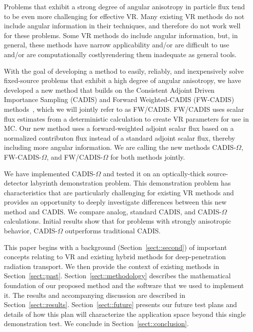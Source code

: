 \documentclass[12pt]{article}
\begin{document}
Problems that exhibit a strong degree of angular anisotropy in particle flux tend to be even more challenging for effective VR.
Many existing VR methods do not include angular information in their techniques, and therefore do not work well for these problems.  
Some VR methods do include angular information, but, in general, these methods have narrow applicability and/or are difficult to use and/or are computationally costly\textemdash rendering them inadequate as general tools.

With the goal of developing a method to easily, reliably, and inexpensively solve fixed-source problems that exhibit a high degree of angular anisotropy, we have developed a new method that builds on the Consistent Adjoint Driven Importance Sampling (CADIS) and Forward Weighted-CADIS (FW-CADIS) methods~\cite{wagner_forward-weighted_2007}, which we will jointly refer to as FW/CADIS. 
FW/CADIS uses scalar flux estimates from a deterministic calculation to create VR parameters for use in MC.
Our new method uses a forward-weighted adjoint scalar flux based on a normalized contributon flux instead of a standard adjoint scalar flux, thereby including more angular information. 
We are calling the new methods CADIS-$\Omega$, FW-CADIS-$\Omega$, and FW/CADIS-$\Omega$ for both methods jointly.

We have implemented CADIS-$\Omega$ and tested it on an optically-thick source-detector labyrinth demonstration problem.
This demonstration problem has characteristics that are particularly challenging for existing VR methods and provides an opportunity to deeply investigate differences between this new method and CADIS.
We compare analog, standard CADIS, and CADIS-$\Omega$ calculations. 
Initial results show that for problems with strongly anisotropic behavior, CADIS-$\Omega$ outperforms traditional CADIS.

This paper begins with a background (Section~\ref{sect::second}) of important concepts relating to VR and existing hybrid methods for deep-penetration radiation transport. 
We then provide the context of existing methods in Section~\ref{sect::past}. 
Section~\ref{sect::methodology} describes the mathematical foundation of our proposed method and the software that we used to implement it. 
The results and accompanying discussion are described in Section~\ref{sect::results}. Section~\ref{sect::future} presents our future test plans and details of how this plan will characterize the application space beyond this single demonstration test. 
We conclude in Section~\ref{sect::conclusion}. 
\end{document}

